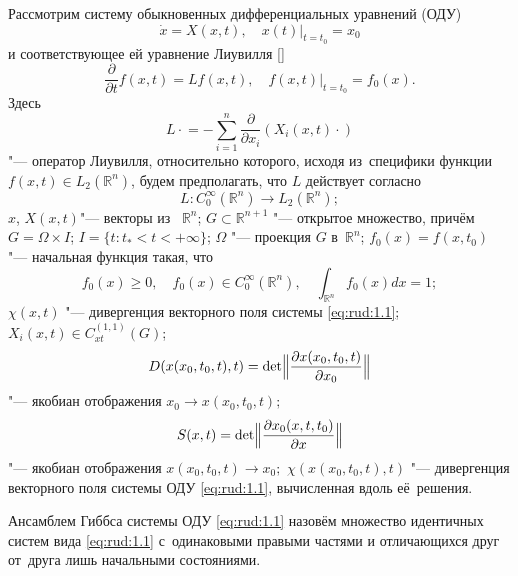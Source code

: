  Рассмотрим систему обыкновенных дифференциальных уравнений (ОДУ)
\begin{equation}
\dot x=X(x,t), \quad  x(t)\bigr|_{t=t_0}=x_0
\label{eq:rud:1.1}
\end{equation}
и соответствующее ей уравнение Лиувилля
[]
\begin{equation}
\frac{\partial}{\partial t}f(x,t)=Lf(x,t), \quad  f(x,t)\bigr|_{t=t_0}=f_0(x).\label{eq:rud:1.2}
\end{equation}
Здесь
 \begin{equation}
L{}\cdot{}=-\sum\limits_{i=1}^{n}\frac{\partial}{\partial x_i}(X_i(x,t){}\cdot{})\label{eq:rud:1.3}
\end{equation}
 "--- оператор
Лиувилля, относительно которого, исходя из~специфики функции $f(x,t)\in L_2{(\mathbb R^n)}$, будем предполагать, что $L$
действует согласно 
\begin{equation}
L: C_{0}^{\infty}{(\mathbb R^n)}\to  L_2{(\mathbb  R^n)};\label{eq:rud:1.4}
\end{equation}
$x$, $X(x,t)$"--- векторы из~ $\mathbb R^n$; $G\subset \mathbb R^{n+1}$ "--- открытое множество, причём \linebreak $G=\Omega\times I$;
$I=\lbrace t:t_*< t <+\infty\rbrace$; $\Omega$ "--- проекция $G$ в~$\mathbb R^n$; $f_0(x)=f(x,t_0)$ "--- начальная функция
такая, что
\begin{equation}
f_0(x)\ge 0, \quad   f_0(x)\in C_{0}^{\infty}(\mathbb R^n), \quad  \int_{\mathbb R^n}f_0(x)dx=1;
\label{eq:rud:1.5}
\end{equation}
$\chi (x,t)$ "--- дивергенция векторного поля системы \eqref{eq:rud:1.1};  
$ X_i(x,t)\in C_{xt}^{(1,1)}(G)$; 
$$D(x(x_0,t_0,t),t)=\mathop{\rm det}\Bigl\Vert\frac{{\partial  x(x_0,t_0,t)}}{\partial{x_0}}\Bigr\Vert$$
"--- якобиан отображения $x_0\to x(x_0,t_0,t);$
$$S(x,t)=\mathop{\rm det}\Bigl\Vert\frac{\partial{x_0(x,t,t_0)}}{\partial x}\Bigr\Vert$$
"--- якобиан отображения $x(x_0,t_0,t)\to  x_0;$
$\chi(x(x_0,t_0,t),t)$ "--- дивергенция векторного поля системы
ОДУ \eqref{eq:rud:1.1}, вычисленная вдоль её~решения.

Ансамблем Гиббса системы ОДУ \eqref{eq:rud:1.1} назовём множество идентичных систем вида \eqref{eq:rud:1.1} с~одинаковыми правыми частями и отличающихся друг от~друга лишь начальными состояниями.

